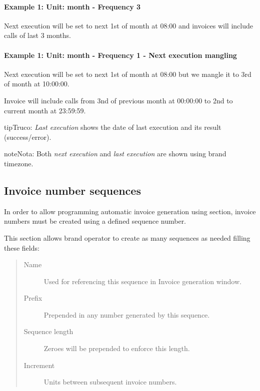 \documentclass[letterpaper,10pt,spanish]{sphinxmanual}
\begin{document}
\paragraph{Example 1: Unit: month - Frequency 3}

Next execution will be set to next 1st of month at 08:00 and invoices will include calls of last 3 months.
\paragraph{Example 1: Unit: month - Frequency 1 - Next execution mangling}

Next execution will be set to next 1st of month at 08:00 but we mangle it to 3rd of month at 10:00:00.

Invoice will include calls from 3nd of previous month at 00:00:00 to 2nd to current month at 23:59:59.

\begin{notice}{tip}{Truco:}
\emph{Last execution} shows the date of last execution and its result (success/error).
\end{notice}

\begin{notice}{note}{Nota:}
Both \emph{next execution} and \emph{last execution} are shown using brand timezone.
\end{notice}


\subsection{Invoice number sequences}
\label{administration_portal/brand/invoicing/invoice_number_sequences:invoice-number-sequences}\label{administration_portal/brand/invoicing/invoice_number_sequences::doc}
In order to allow programming automatic invoice generation using {\hyperref[administration_portal/brand/invoicing/invoice_schedulers:invoice\string-schedulers]{}} section, invoice
numbers must be created using a defined sequence number.

This section allows brand operator to create as many sequences as needed filling these fields:
\begin{quote}
\begin{description}
\item[{Name}] \leavevmode
Used for referencing this sequence in Invoice generation window.

\item[{Prefix}] \leavevmode
Prepended in any number generated by this sequence.

\item[{Sequence length}] \leavevmode
Zeroes will be prepended to enforce this length.

\item[{Increment}] \leavevmode
Units between subsequent invoice numbers.

\end{description}
\end{quote}
\end{document}
